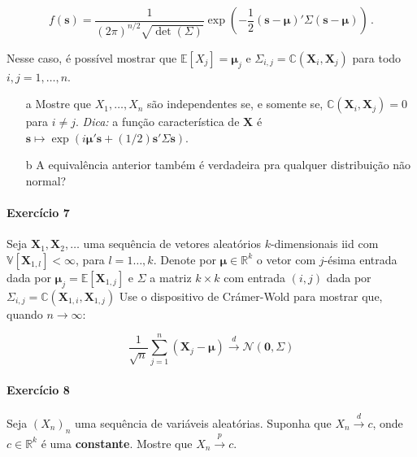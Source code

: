 \documentclass[10pt,a4paper]{article}
\begin{document}
$$f(\boldsymbol{s}) =\frac{1}{(2\pi)^{n/2} \sqrt{\operatorname{det}(\Sigma)}}\exp\left(-\frac{1}{2}(\boldsymbol{s}-\boldsymbol{\mu})'\Sigma (\boldsymbol{s}-\boldsymbol{\mu})\right)\, .$$

Nesse caso, é possível mostrar que $\mathbb{E}[X_j] =\boldsymbol{\mu}_j$ e $\Sigma_{i,j} = \mathbb{C}(\boldsymbol{X}_i,\boldsymbol{X}_j)$ para todo $i,j=1,\ldots, n$.
\begin{itemize}
	\item[a] Mostre que $X_1,\ldots,X_n$ são independentes se, e somente se, $ \mathbb{C}(\boldsymbol{X}_i,\boldsymbol{X}_j) = 0$ para $i\neq j$. \textit{Dica:} a função característica de $\boldsymbol{X}$ é  $\boldsymbol{s}\mapsto \exp(i\boldsymbol{\mu}'\boldsymbol{s} + (1/2)\boldsymbol{s}'\Sigma \boldsymbol{s})$.
	\item[b] A equivalência anterior também é verdadeira pra qualquer distribuição não normal?  
\end{itemize}

\paragraph{Exercício 7} Seja $\boldsymbol{X}_1,\boldsymbol{X}_2,\ldots$ uma sequência de vetores aleatórios $k$-dimensionais iid com $\mathbb{V}[\boldsymbol{X}_{1,l}]<\infty$, para $l=1\ldots, k$. Denote por $\boldsymbol{\mu} \in \mathbb{R}^k$ o vetor com $j$-ésima entrada dada por $\boldsymbol{\mu}_j = \mathbb{E}[\boldsymbol{X}_{1,j}]$ e $\Sigma$ a matriz $k\times k$ com entrada $(i,j)$ dada por $\Sigma_{i,j} = \mathbb{C}(\boldsymbol{X}_{1,i},\boldsymbol{X}_{1,j})$ Use o dispositivo de Crámer-Wold para mostrar que, quando $n \to \infty$:

$$\frac{1}{\sqrt{n}}\sum_{j=1}^n(\boldsymbol{X}_j -\boldsymbol{\mu})\overset{d}{\to}\mathcal{N}(\boldsymbol{0},\Sigma)$$

\paragraph{Exercício 8} Seja $(X_n)_n$ uma sequência de variáveis aleatórias. Suponha que $X_n \overset{d}{\to}c$, onde $c \in \mathbb{R}^k$ é uma \textbf{constante}. Mostre que $X_n \overset{p}{\to} c$.
\end{document}
